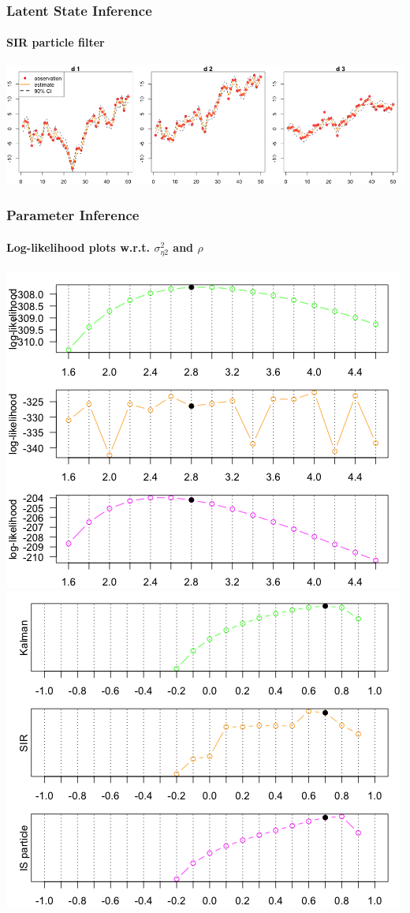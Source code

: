 \documentclass[11pt]{beamer}
\begin{document}
\begin{frame}
\frametitle{Latent State Inference}
\framesubtitle{SIR particle filter}
\centering
\includegraphics[scale=0.35]{mllm-estimate-sir}
\end{frame}

\begin{frame}
\frametitle{Parameter Inference}
\framesubtitle{Log-likelihood plots w.r.t. $\sigma_{\eta 2}^2$ and $\rho$}
\centering
\includegraphics[scale=0.33]{mllm-loglik-var2}
\includegraphics[scale=0.33]{mllm-loglik-rho}
\end{frame}
\end{document}
